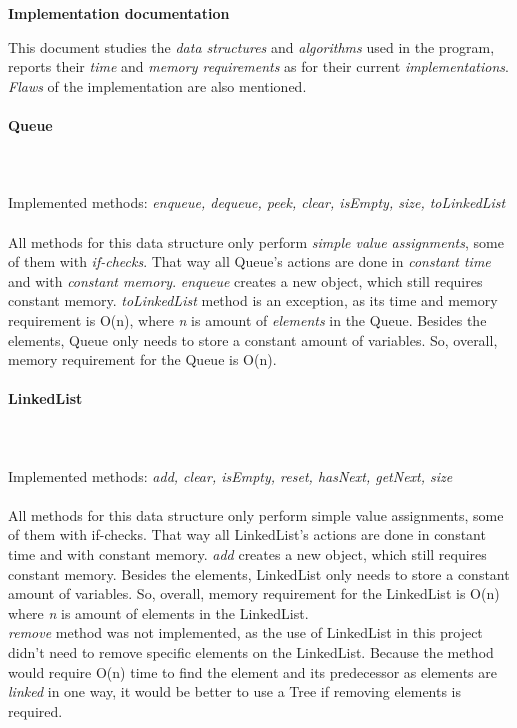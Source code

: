 \documentclass[a4paper,12pt]{article}
\begin{document}
\centerline{\huge \textbf{Implementation documentation}} \hspace*{\fill}

This document studies the \emph{data structures} and \emph{algorithms} used in the program, reports their \emph{time} and \emph{memory requirements} as for their current \emph{implementations}. \emph{Flaws} of the implementation are also mentioned.
\paragraph{\large Queue} \hspace{0pt} \\
\\
Implemented methods: \emph{enqueue, dequeue, peek, clear, isEmpty, size, toLinkedList}\\
\\
All methods for this data structure only perform \emph{simple value assignments}, some of them with \emph{if-checks}. That way all Queue's actions are done in \emph{constant time} and with \emph{constant memory}. \emph{enqueue} creates a new object, which still requires constant memory. \emph{toLinkedList} method is an exception, as its time and memory requirement is O(n), where \emph{n} is amount of \emph{elements} in the Queue. Besides the elements, Queue only needs to store a constant amount of variables. So, overall, memory requirement for the Queue is O(n).
\\

\paragraph{\large LinkedList} \hspace{0pt} \\
\\
Implemented methods: \emph{add, clear, isEmpty, reset, hasNext, getNext, size}\\
\\
All methods for this data structure only perform simple value assignments, some of them with if-checks. That way all LinkedList's actions are done in constant time and with constant memory. \emph{add} creates a new object, which still requires constant memory. Besides the elements, LinkedList only needs to store a constant amount of variables. So, overall, memory requirement for the LinkedList is O(n) where \emph{n} is amount of elements in the LinkedList.\\
\emph{remove} method was not implemented, as the use of LinkedList in this project didn't need to remove specific elements on the LinkedList. Because the method would require O(n) time to find the element and its predecessor as elements are \emph{linked} in one way, it would be better to use a Tree if removing elements is required.
\\
\end{document}
